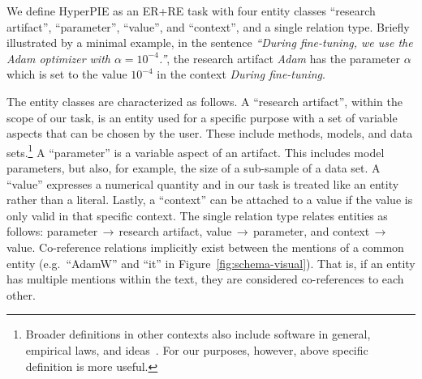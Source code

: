 
We define HyperPIE as an ER+RE task with four entity classes ``research artifact'', ``parameter'', ``value'', and ``context'', and a single relation type. Briefly illustrated by a minimal example, in the sentence \textit{``During fine-tuning, we use the Adam optimizer with $\mathit{\alpha=10^{-4}}$.''}, the research artifact \textit{Adam} has the parameter $\mathit{\alpha}$ which is set to the value $\mathit{10^{-4}}$ in the context \textit{During fine-tuning}.

The entity classes are characterized as follows. A ``research artifact'', within the scope of our task, is an entity used for a specific purpose with a set of variable aspects that can be chosen by the user. These include methods, models, and data sets.\footnote{Broader definitions in other contexts also include software in general, empirical laws, and ideas~\cite{Lin2022}. For our purposes, however, above specific definition is more useful.} A ``parameter'' is a variable aspect of an artifact. This includes model parameters, but also, for example, the size of a sub-sample of a data set. A ``value'' expresses a numerical quantity and in our task is treated like an entity rather than a literal. Lastly, a ``context'' can be attached to a value if the value is only valid in that specific context. The single relation type relates entities as follows: parameter\,$\rightarrow$\,research artifact, value\,$\rightarrow$\,parameter, and context\,$\rightarrow$\,value.
Co-reference relations %
implicitly exist between the mentions of a common entity (e.g.\ ``AdamW'' and ``it'' in Figure~\ref{fig:schema-visual}). That is, if an entity has multiple mentions within the text, they are considered co-references to each other.



